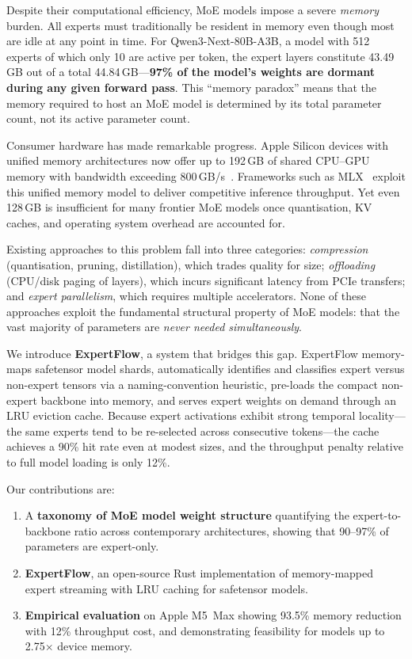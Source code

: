 \documentclass[11pt,a4paper]{article}
\begin{document}
Despite their computational efficiency, MoE models impose a severe
\emph{memory} burden. All experts must traditionally be resident in memory even
though most are idle at any point in time. For Qwen3-Next-80B-A3B, a model
with 512 experts of which only 10 are active per token, the expert layers
constitute 43.49\,GB out of a total 44.84\,GB---\textbf{97\% of the model's
weights are dormant during any given forward pass}. This ``memory paradox''
means that the memory required to host an MoE model is determined by its total
parameter count, not its active parameter count.

Consumer hardware has made remarkable progress. Apple Silicon devices with
unified memory architectures now offer up to 192\,GB of shared CPU--GPU memory
with bandwidth exceeding 800\,GB/s~\citep{apple2024m4}. Frameworks such as
MLX~\citep{mlx2023} exploit this unified memory model to deliver competitive
inference throughput. Yet even 128\,GB is insufficient for many frontier MoE
models once quantisation, KV caches, and operating system overhead are
accounted for.

Existing approaches to this problem fall into three categories:
\emph{compression} (quantisation, pruning, distillation), which trades quality
for size; \emph{offloading} (CPU/disk paging of layers), which incurs
significant latency from PCIe transfers; and \emph{expert parallelism}, which
requires multiple accelerators. None of these approaches exploit the
fundamental structural property of MoE models: that the vast majority of
parameters are \emph{never needed simultaneously}.

We introduce \textbf{ExpertFlow}, a system that bridges this gap.
ExpertFlow memory-maps safetensor model shards, automatically identifies and
classifies expert versus non-expert tensors via a naming-convention heuristic,
pre-loads the compact non-expert backbone into memory, and serves expert
weights on demand through an LRU eviction cache. Because expert activations
exhibit strong temporal locality---the same experts tend to be re-selected
across consecutive tokens---the cache achieves a 90\% hit rate even at modest
sizes, and the throughput penalty relative to full model loading is only 12\%.

Our contributions are:
\begin{enumerate}[nosep]
  \item A \textbf{taxonomy of MoE model weight structure} quantifying the
    expert-to-backbone ratio across contemporary architectures, showing that
    90--97\% of parameters are expert-only.
  \item \textbf{ExpertFlow}, an open-source Rust implementation of
    memory-mapped expert streaming with LRU caching for safetensor models.
  \item \textbf{Empirical evaluation} on Apple M5~Max showing 93.5\% memory
    reduction with 12\% throughput cost, and demonstrating feasibility for
    models up to 2.75$\times$ device memory.
\end{enumerate}
\end{document}
